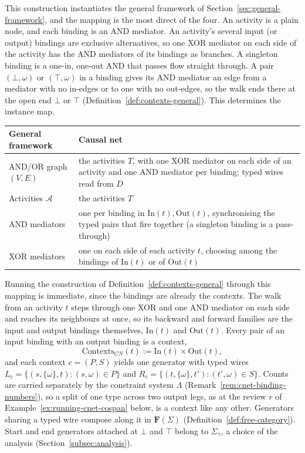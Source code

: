 This construction instantiates the general framework of Section~\ref{sec:general-framework}, and
the mapping is the most direct of the four. An activity is a plain node, and each binding is an
AND mediator. An activity's several input (or output) bindings are exclusive alternatives, so one
XOR mediator on each side of the activity has the AND mediators of its bindings as branches. A
singleton binding is a one-in, one-out AND that passes flow straight through. A pair $(\bot,\omega)$
or $(\top,\omega)$ in a binding gives its AND mediator an edge from a mediator with no in-edges or
to one with no out-edges, so the walk ends there at the open end $\bot$ or $\top$
(Definition~\ref{def:contexts-general}). This determines the instance map.
\medskip
\begin{center}
  \small\begin{tabularx}{\linewidth}{@{}lX@{}}
    \hline
    General framework & Causal net \\
    \hline
    AND/OR graph $(V,E)$ & the activities $T$, with one XOR mediator on each side of an activity and one AND mediator per binding; typed wires read from $D$ \\
    Activities $\mathcal{A}$ & the activities $T$ \\
    AND mediators & one per binding in $\mathrm{In}(t),\mathrm{Out}(t)$, synchronising the typed pairs that fire together (a singleton binding is a pass-through) \\
    XOR mediators & one on each side of each activity $t$, choosing among the bindings of $\mathrm{In}(t)$ or of $\mathrm{Out}(t)$ \\
    \hline
  \end{tabularx}
\end{center}
\medskip
Running the construction of Definition~\ref{def:contexts-general} through this mapping is
immediate, since the bindings are already the contexts. The walk from an activity $t$ steps
through one XOR and one AND mediator on each side and reaches its neighbours at once, so its
backward and forward families are the input and output bindings themselves, $\mathrm{In}(t)$ and
$\mathrm{Out}(t)$. Every pair of an input binding with an output binding is a context,
\[
  \mathrm{Contexts}_{CN}(t):=\mathrm{In}(t)\times \mathrm{Out}(t),
\]
and each context $c=(P,S)$ yields one generator with typed wires
$L_c=\{(s,\{\omega\},t):(s,\omega)\in P\}$ and $R_c=\{(t,\{\omega\},t'):(t',\omega)\in S\}$.
Counts are carried separately by the constraint system $\Lambda$
(Remark~\ref{rem:cnet-binding-numbers}), so a split of one type across two output legs, as at the
review $r$ of Example~\ref{ex:running-cnet-cospan} below, is a context like any other. Generators
sharing a typed wire compose along it in $\mathbf{F}(\Sigma)$ (Definition~\ref{def:free-category}).
Start and end generators attached at $\bot$ and $\top$ belong to $\Sigma_\gamma$, a choice of the
analysis (Section~\ref{subsec:analysis}).

